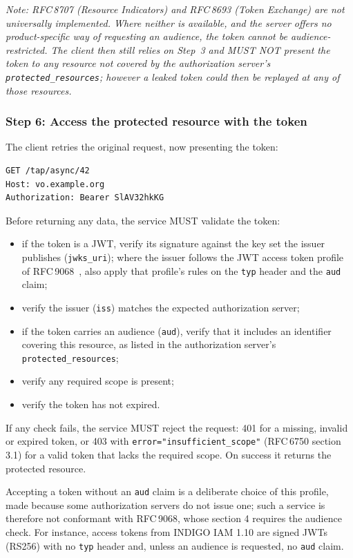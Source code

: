 \documentclass[11pt,a4paper]{ivoa}
\newcommand{\rfc}[1]{RFC\,#1}
\begin{document}
{\itshape Note: \rfc{8707} (Resource Indicators) and \rfc{8693} (Token Exchange)
are not universally implemented. Where neither is available, and the server
offers no product-specific way of requesting an audience, the token cannot
be audience-restricted. The client then still relies on Step~3 and MUST NOT
present the token to any resource not covered by the authorization server's
\verb|protected_resources|; however a leaked token could then be replayed at
any of those resources.}

\subsubsection{Step 6: Access the protected resource with the token}

The client retries the original request, now presenting the token:

\begin{verbatim}
GET /tap/async/42
Host: vo.example.org
Authorization: Bearer SlAV32hkKG
\end{verbatim}

Before returning any data, the service MUST validate the token:
\begin{itemize}
\item if the token is a JWT, verify its signature against the key set the
      issuer publishes ({\tt jwks\_uri}); where the issuer follows the JWT
      access token profile of \rfc{9068}~\citep{std:RFC9068}, also apply that profile's rules on
      the {\tt typ} header and the {\tt aud} claim;
\item verify the issuer (\verb|iss|) matches the expected authorization server;
\item if the token carries an audience (\verb|aud|), verify that it includes
      an identifier covering this resource, as listed in the authorization
      server's \verb|protected_resources|;
\item verify any required scope is present;
\item verify the token has not expired.
\end{itemize}

If any check fails, the service MUST reject the request: 401 for a missing,
invalid or expired token, or 403 with \verb|error="insufficient_scope"|
(\rfc{6750} section 3.1) for a valid token that lacks the required scope.
On success it returns the protected resource.

Accepting a token without an {\tt aud} claim is a deliberate choice of this
profile, made because some authorization servers do not issue one; such a
service is therefore not conformant with \rfc{9068}, whose section 4
requires the audience check. For instance, access tokens from INDIGO IAM 1.10
are signed JWTs (RS256) with no {\tt typ} header and, unless an audience is
requested, no {\tt aud} claim.
\end{document}
